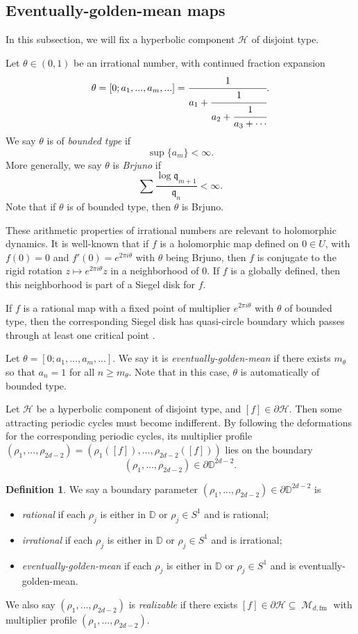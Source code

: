 \documentclass[11pt, reqno]{amsart}
\numberwithin{equation}{section}
\theoremstyle{plain}
\theoremstyle{theorem}
\theoremstyle{plain}
\theoremstyle{definition}
\newtheorem{defn}[theorem]{Definition}
\newcommand{\D}{\mathbb{D}}
\newcommand{\fm}{\text{fm}}
\DeclareMathOperator{\M}{\mathcal{M}}
\numberwithin{figure}{section}
\begin{document}
\subsection{Eventually-golden-mean maps}\label{subsec:egmssm}
In this subsection, we will fix a hyperbolic component $\mathcal{H}$ of disjoint type.

Let $\theta \in (0,1)$ be an irrational number, with continued fraction expansion
$$
\theta =  [0; a_1,..., a_m,...] = \cfrac{1}{a_1+\cfrac{1}{a_2+\cfrac{1}{ a_3+\cdots}}}.
$$
We say $\theta$ is of {\em bounded type} if
$$
\sup \{a_m\} < \infty.
$$
More generally, we say $\theta$ is {\em Brjuno} if
$$
\sum\frac{\log \mathfrak{q}_{m+1}}{\mathfrak{q}_n} < \infty.
$$
Note that if $\theta$ is of bounded type, then $\theta$ is Brjuno.

These arithmetic properties of irrational numbers are relevant to holomorphic dynamics.
It is well-known that if $f$ is a holomorphic map defined on $0 \in U$, with $f(0) = 0$ and $f'(0) = e^{2\pi i \theta}$ with $\theta$ being Brjuno, then $f$ is conjugate to the rigid rotation $z \mapsto e^{2\pi i \theta}z$ in a neighborhood of $0$.
If $f$ is a globally defined, then this neighborhood is part of a Siegel disk for $f$.

If $f$ is a rational map with a fixed point of multiplier $e^{2\pi i \theta}$ with $\theta$ of bounded type, then the corresponding Siegel disk has quasi-circle boundary which passes through at least one critical point \cite{Zha11}.

Let $\theta = [0; a_1,..., a_m, ...]$.
We say it is {\em eventually-golden-mean} if there exists $m_\theta$ so that $a_n = 1$ for all $n \geq m_\theta$.
Note that in this case, $\theta$ is automatically of bounded type.

Let $\mathcal{H}$ be a hyperbolic component of disjoint type, and $[f] \in \partial{\mathcal{H}}$.
Then some attracting periodic cycles must become indifferent.
By following the deformations for the corresponding periodic cycles, its multiplier profile $(\rho_1,..., \rho_{2d-2}) = (\rho_1([f]),..., \rho_{2d-2}([f]))$ lies on the boundary 
$$
(\rho_1,..., \rho_{2d-2}) \in \partial\D^{2d-2}.
$$ 

\begin{defn}
We say a boundary parameter  $(\rho_1,..., \rho_{2d-2}) \in \partial\D^{2d-2}$ is
\begin{itemize}
\item {\em rational} if each $\rho_j$ is either in $\D$ or $\rho_j \in S^1$ and is rational;
\item {\em irrational} if each $\rho_j$ is either in $\D$ or $\rho_j \in S^1$ and is irrational;
\item {\em eventually-golden-mean} if each $\rho_j$ is either in $\D$ or $\rho_j \in S^1$ and is eventually-golden-mean.
\end{itemize}
We also say  $(\rho_1,..., \rho_{2d-2})$  is {\em realizable} if there exists $[f] \in \partial{\mathcal{H}} \subseteq \M_{d,\fm}$ with multiplier profile $(\rho_1,..., \rho_{2d-2})$.
\end{defn}
\end{document}

